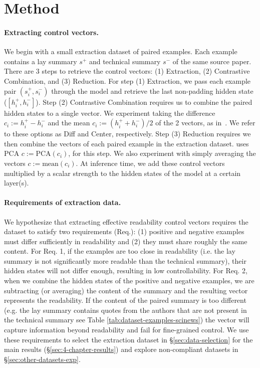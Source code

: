 \section{Method}\label{sec:4-chapter-method}

\paragraph{Extracting control vectors.} 
We begin with a small extraction dataset of paired examples. Each example contains a lay summary $s^{+}$ and technical summary $s^{-}$ of the same source paper. There are 3 steps to retrieve the control vectors: (1) Extraction, (2) Contrastive Combination, and (3) Reduction. For step (1) Extraction, we pass each example pair $(s^+_{i}, s^-_{i})$ through the model and retrieve the last non-padding hidden state ($[h^+_i, h^-_i]$).  Step (2) Contrastive Combination requires us to combine the paired hidden states to a single vector. We experiment taking the difference $c_{i} := h^+_i - h^-_i$ and the mean $c_{i} := (h^+_i + h^-_i )/2$ of the 2 vectors, as in~\textcite{luo2022readability}. We refer to these options as \textrm{Diff} and \textrm{Center}, respectively. Step (3) Reduction requires we then combine the vectors of each paired example in the extraction dataset. \textcite{luo2022readability} uses PCA $c := \textrm{PCA}(c_i)$, for this step. We also experiment with simply averaging the vectors $c := \textrm{mean}(c_i)$.
At inference time, we add these control vectors multiplied by a scalar strength to the hidden states of the model at a certain layer(s). 

\paragraph{Requirements of extraction data.} We hypothesize that extracting effective readability control vectors requires the dataset to satisfy two requirements (Req.): (1) positive and negative examples must differ sufficiently in readability and (2) they must share roughly the same content. For Req. 1, if the examples are too close in readability (i.e. the lay summary is not significantly more readable than the technical summary), their hidden states will not differ enough, resulting in low controllability. For Req. 2, when we combine the hidden states of the positive and negative examples, we are subtracting (or averaging) the content of the summary and the resulting vector represents the readability. If the content of the paired summary is too different (e.g. the lay summary contains quotes from the authors that are not present in the technical summary see Table \ref{tab:dataset-examples-scinews}) the vector will capture information beyond readability and fail for fine-grained control. We use these requirements to select the extraction dataset in \S\ref{sec:data-selection} for the main results (\S\ref{sec:4-chapter-results}) and explore non-compliant datasets in \S\ref{sec:other-datasets-exp}.


